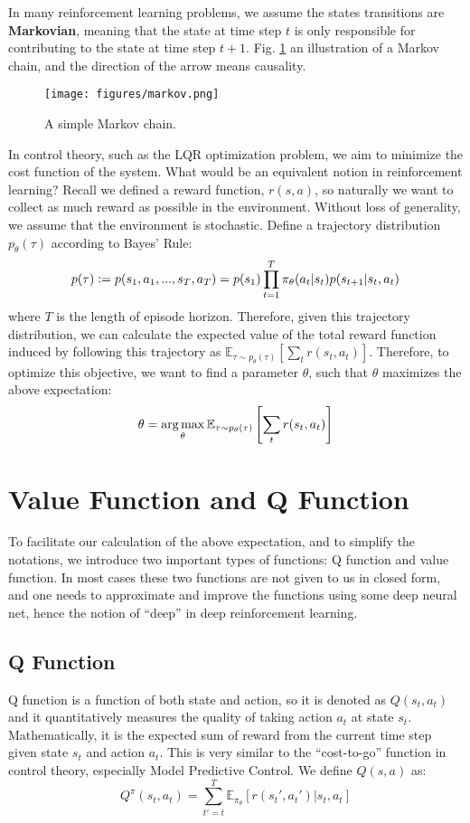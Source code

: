 In many reinforcement learning problems, we assume the states transitions are \textbf{Markovian}, meaning that the state at time step $t$ is only responsible for contributing to the state at time step $t+1$.
Fig. \ref{fig:markov} an illustration of a Markov chain, and the direction of the arrow means causality.
\begin{figure}
    \centering
    \texttt{[image: figures/markov.png]}
    \caption{A simple Markov chain.}
    \label{fig:markov}
\end{figure}

In control theory, such as the LQR optimization problem, we aim to minimize the cost function of the system. What would be an equivalent notion in reinforcement learning? Recall we defined a reward function, $r(s,a)$, so naturally we want to collect as much reward as possible in the environment. Without loss of generality, we assume that the environment is stochastic. Define a trajectory distribution $p_\theta(\tau)$ according to Bayes' Rule:
$$ p(\tau) \vcentcolon= p(s_1,a_1,...,s_T,a_T) = p(s_1)\prod_{t=1}^T\pi_\theta(a_t|s_t)p(s_{t+1}|s_t,a_t)$$
where $T$ is the length of episode horizon. Therefore, given this trajectory distribution, we can calculate the expected value of the total reward function induced by following this trajectory as $\mathbb{E}_{\tau\sim p_\theta(\tau)}\left[\sum_t r(s_t,a_t)\right]$. Therefore, to optimize this objective, we want to find a parameter $\theta$, such that $\theta$ maximizes the above expectation:
$$\theta = \operatorname*{arg\,max}_\theta\mathbb{E}_{\tau\sim p_\theta(\tau)}\left[\sum_t r(s_t,a_t)\right]$$
\section{Value Function and Q Function}
To facilitate our calculation of the above expectation, and to simplify the notations, we introduce two important types of functions: Q function and value function. In most cases these two functions are not given to us in closed form, and one needs to approximate and improve the functions using some deep neural net, hence the notion of ``deep'' in deep reinforcement learning.
\subsection{Q Function}
Q function is a function of both state and action, so it is denoted as $Q(s_t,a_t)$ and it quantitatively measures the quality of taking action $a_t$ at state $s_t$. Mathematically, it is the expected sum of reward from the current time step given state $s_t$ and action $a_t$. This is very similar to the ``cost-to-go'' function in control theory, especially Model Predictive Control. We define $Q(s,a)$ as:
$$Q^\pi(s_t,a_t) = \sum_{t'=t}^T{\mathbb{E}_{\pi_\theta}[r(s_t',a_t')|s_t,a_t]}$$
